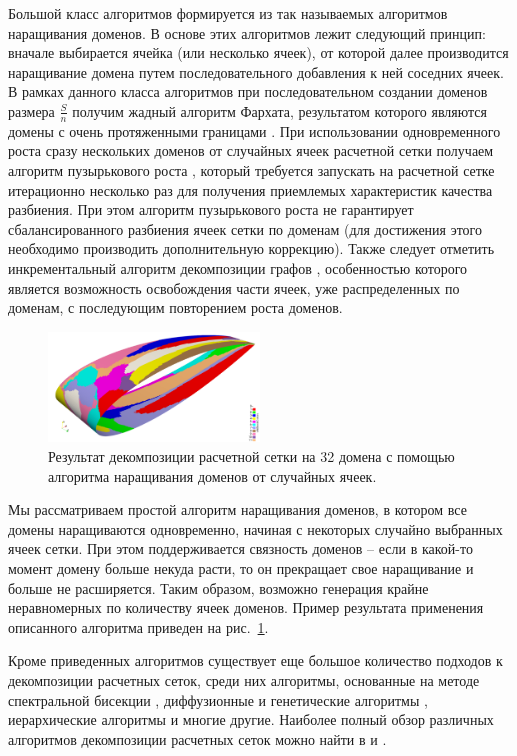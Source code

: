 Большой класс алгоритмов формируется из так называемых алгоритмов наращивания доменов.
В основе этих алгоритмов лежит следующий принцип: вначале выбирается ячейка (или несколько ячеек), от которой далее производится наращивание домена путем последовательного добавления к ней соседних ячеек.
В рамках данного класса алгоритмов при последовательном создании доменов размера $\frac{S}{n}$ получим жадный алгоритм Фархата, результатом которого являются домены с очень протяженными границами \cite{Farhat1988Decomp}.
При использовании одновременного роста сразу нескольких доменов от случайных ячеек расчетной сетки получаем алгоритм пузырькового роста \cite{Preis1997Decomp}, который требуется запускать на расчетной сетке итерационно несколько раз для получения приемлемых характеристик качества разбиения.
При этом алгоритм пузырькового роста не гарантирует сбалансированного разбиения ячеек сетки по доменам (для достижения этого необходимо производить дополнительную коррекцию).
Также следует отметить инкрементальный алгоритм декомпозиции графов \cite{Yakobovsky2005Decomp}, особенностью которого является возможность освобождения части ячеек, уже распределенных по доменам, с последующим повторением роста доменов.

\begin{figure}[ht]
	\centering
	\includegraphics[width=0.5\textwidth]{./pics/text_2_decompsurf/wing_rgrow_32.png}
	\caption{Результат декомпозиции расчетной сетки на 32 домена с помощью алгоритма наращивания доменов от случайных ячеек.}
	\label{fig:text_2_decompsurf_wing_rgrow_32}
\end{figure}

Мы рассматриваем простой алгоритм наращивания доменов, в котором все домены наращиваются одновременно, начиная с некоторых случайно выбранных ячеек сетки.
При этом поддерживается связность доменов -- если в какой-то момент домену больше некуда расти, то он прекращает свое наращивание и больше не расширяется.
Таким образом, возможно генерация крайне неравномерных по количеству ячеек доменов. Пример результата применения описанного алгоритма приведен на рис.~\ref{fig:text_2_decompsurf_wing_rgrow_32}.

Кроме приведенных алгоритмов существует еще большое количество подходов к декомпозиции расчетных сеток, среди них алгоритмы, основанные на методе спектральной бисекции \cite{Urschel2014Decomp}, диффузионные и генетические алгоритмы \cite{Zhao2019Decomp}, иерархические алгоритмы \cite{Kapyris1998Decomp} и многие другие.
Наиболее полный обзор различных алгоритмов декомпозиции расчетных сеток можно найти в \cite{Golovchenko2020Decomp} и \cite{Zheleznyakova2017Decomp}.

